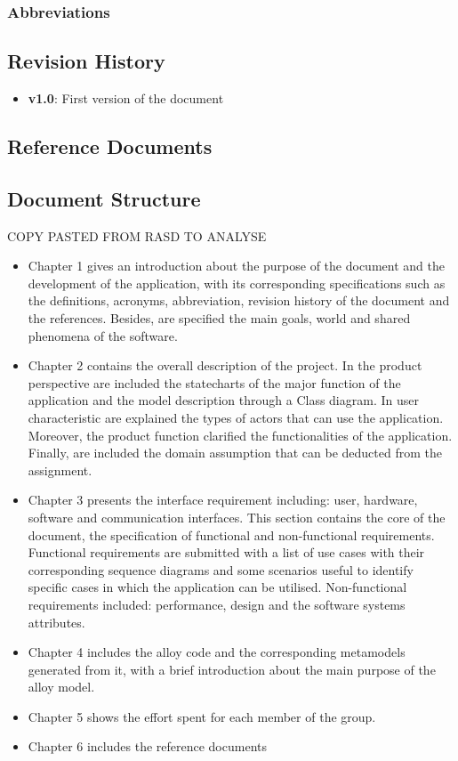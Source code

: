 \subsubsection{Abbreviations}


\subsection{Revision History}
\begin{itemize}
	\item
	\textbf{v1.0}: First version of the document
\end{itemize}


\subsection{Reference Documents}

\subsection{Document Structure}
COPY PASTED FROM RASD TO ANALYSE
\begin{itemize}

\item
Chapter 1 gives an introduction about the purpose of the document and the development of the
application, with its corresponding specifications such as the definitions, acronyms, abbreviation,
revision history of the document and the references.
Besides, are specified the main goals, world and shared phenomena of the software.

\item
Chapter 2 contains the overall description of the project. In the product perspective are included
the statecharts of the major function of the application and the model description through a Class
diagram. In user characteristic are explained the types of actors that can use the application.
Moreover, the product function clarified the functionalities of the application. Finally, are included
the domain assumption that can be deducted from the assignment.

\item
Chapter 3 presents the interface requirement including: user, hardware, software and
communication interfaces. This section contains the core of the document, the specification of
functional and non-functional requirements. Functional requirements are submitted with a list of
use cases with their corresponding sequence diagrams and some scenarios useful to identify
specific cases in which the application can be utilised. Non-functional requirements included:
performance, design and the software systems attributes.

\item
Chapter 4 includes the alloy code and the corresponding metamodels generated from it, with a
brief introduction about the main purpose of the alloy model.

\item
Chapter 5 shows the effort spent for each member of the group.

\item
Chapter 6 includes the reference documents
\end{itemize}

